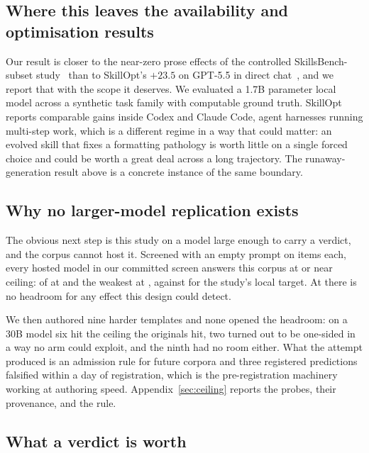 \subsection{Where this leaves the availability and optimisation results}

Our result is closer to the near-zero prose effects of the controlled
SkillsBench-subset study~\citep{skillsbench2026} than to SkillOpt's $+23.5$
on GPT-5.5 in direct chat~\citep{skillopt2026}, and we report that with the
scope it deserves. We evaluated a 1.7B parameter local model across a
synthetic task family with computable ground truth. SkillOpt reports
comparable gains inside Codex and Claude Code, agent harnesses running
multi-step work, which is a different regime in a way that could matter: an
evolved skill that fixes a formatting pathology is
worth little on a single forced choice and could be worth a great deal across
a long trajectory. The runaway-generation result above is a concrete instance
of the same boundary.

\subsection{Why no larger-model replication exists}
\label{sec:noreplication}

The obvious next step is this study on a model large enough to carry a
verdict, and the corpus cannot host it. Screened with an empty prompt on
\NUM{\screenItems} items each, every hosted model in our committed screen
answers this corpus at or near ceiling: \NUM{\screenAtCeiling} of
\NUM{\screenModels} at \NUM{\screenBest} and the weakest at
\NUM{\screenWorst}, against \NUM{\accUnseenOff} for the study's local target.
At \NUM{\screenWorst} there is no headroom for any effect this design could
detect.

We then authored nine harder templates and none opened the headroom: on a 30B
model six hit the ceiling the originals hit, two turned out to be one-sided
in a way no arm could exploit, and the ninth had no room either. What the
attempt produced is an admission rule for future corpora and three
registered predictions falsified within a day of registration, which is the
pre-registration machinery working at authoring speed.
Appendix~\ref{sec:ceiling} reports the probes, their provenance, and the
rule.

\subsection{What a verdict is worth}

